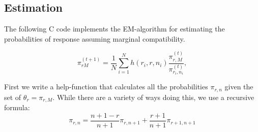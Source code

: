 \documentclass[reqno]{amsart}
\begin{document}
\subsection{Estimation}

The following C code implements the EM-algorithm for estimating the probabilities
of response assuming marginal compatibility.

\begin{equation}
 \pi_{rM}^{(t+1)} = \frac{1}{N}
\sum_{i=1}^{N} h(r_{i},r,n_{i})
             \frac{\pi^{(t)}_{r,M}}{\pi^{(t)}_{r_{i},n_{i}}},
\end{equation}

First we write a help-function that calculates all the probabilities
$\pi_{r,n}$ given the set of $\theta_r=\pi_{r,M}$. While there are a variety
of ways doing this, we use a recursive formula:
\begin{equation}
\pi_{r,n}  = \frac{n+1-r}{n+1}\pi_{r,n+1} + \frac{r+1}{n+1}\pi_{r+1,n+1}
\end{equation}
\end{document}
